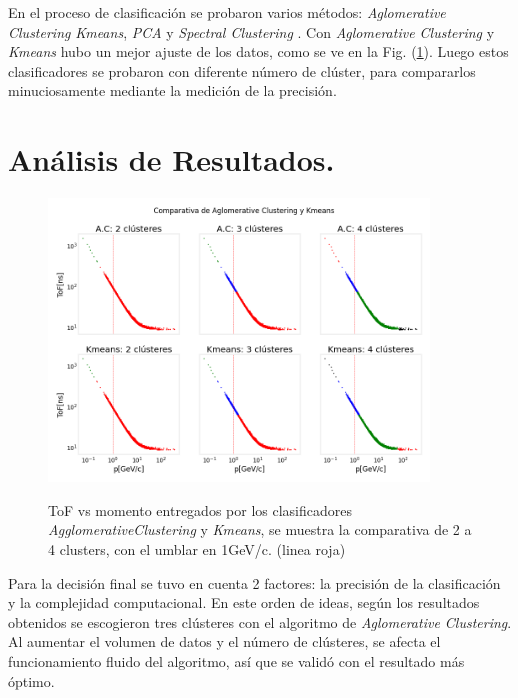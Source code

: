 En el proceso de clasificación se probaron varios métodos: \textit{Aglomerative Clustering}  \textit{Kmeans}, \textit{PCA} y \textit{ Spectral Clustering} . Con \textit{Aglomerative Clustering} y \textit{Kmeans} hubo un mejor ajuste de los datos, como se ve en la Fig. (\ref{ACvskM}). 
Luego estos clasificadores se probaron con diferente número de clúster, para compararlos minuciosamente mediante la medición de la precisión. \\




\section{\textbf{Análisis de Resultados.}}

\begin{figure}[h!]
\begin{center}
\caption{ToF vs momento entregados por los clasificadores \textit{AgglomerativeClustering} y \textit{Kmeans}, se muestra la comparativa de 2 a 4 clusters, con el umblar en 1GeV/c. (linea roja)}
\includegraphics[width=0.9\textwidth]{Figures/imagenes/AK.png}
\label{ACvskM}
\end{center}
\end{figure}

Para la decisión final se tuvo en cuenta 2 factores: la precisión de la clasificación y la complejidad computacional.  En este orden de ideas, según los resultados obtenidos se escogieron tres clústeres con el algoritmo de \textit{Aglomerative Clustering}. Al aumentar el volumen de datos y el número de clústeres, se afecta el funcionamiento fluido del algoritmo, así que se validó con el resultado más óptimo.\\


